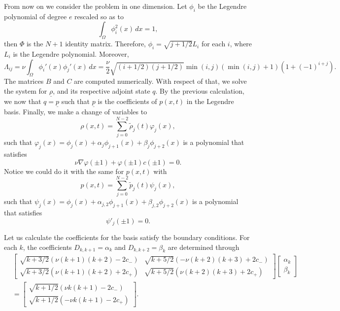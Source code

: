 \documentclass[12pt]{article}
\newcommand{\rhovec}{\underline{\rho}}
\theoremstyle{definition}
\begin{document}
From now on we consider the problem in one dimension. 
Let $\phi_i$ be the Legendre polynomial of degree $e$ rescaled so as to 
\[
\int_{\Omega} \phi^2_i(x) \, dx = 1,
\]
then $\Phi$ is the $N+1$ identity matrix.
Therefore, $\phi_i = \sqrt{j + 1/2} L_i$ for each $i$, where $L_i$ is the Legendre polynomial.
Moreover, 
\[    
\Lambda_{ij} = \nu \int_{\Omega} \phi_i'(x) \phi_j'(x) \, dx =  \frac{\nu}{2} \sqrt{(i+1/2)(j+1/2)}\min(i,j) (\min(i,j) + 1)\left(1 + {(-1)}^{i+j}\right).
\]
The matrices $B$ and $C$ are computed numerically.
With respect of that, we solve the system for $\rhovec$, and its respective adjoint state $q$. 
By the previous calculation, we now that $q = \underline{p}$ such that $\underline{p}$ is the coefficients of $p(x,t)$ in the Legendre basis.
Finally, we make a change of variables to 
\[
\rho(x,t) = \sum_{j=0}^{N-2} \tilde{\rho}_j(t) \varphi_j(x),     
\]
such that $\varphi_j(x) = \phi_j(x) + \alpha_j \phi_{j+1}(x) + \beta_j \phi_{j+2}(x)$ is a polynomial that satisfies 
\[
\nu \nabla \varphi(\pm 1) + \varphi(\pm 1) c(\pm 1) = 0.
\]
Notice we could do it with the same for $p(x,t)$ with
\[
p(x,t) = \sum_{j=0}^{N-2} \tilde{p}_j(t) \psi_j(x), 
\]
such that $\psi_j(x) = \phi_j(x) + \alpha_{j,2} \phi_{j+1}(x) + \beta_{j,2} \phi_{j+2}(x)$ is a polynomial that satisfies 
\[
\psi'_j(\pm 1) = 0.
\]

Let us calculate the coefficients for the basis satisfy the boundary conditions.
For each $k$, the coefficients $D_{k,k+1} = \alpha_k$ and $D_{k,k+2} = \beta_k$ are determined through
\[
\begin{split}
    &\begin{bmatrix}
        \sqrt{k + 3/2}(\nu (k+1)(k+2) - 2c_{-}) & \sqrt{k + 5/2}(-\nu (k+2)(k+3) + 2c_-) \\
        \sqrt{k + 3/2}(\nu (k+1)(k+2) + 2c_+) & \sqrt{k + 5/2}(\nu (k+2)(k+3) + 2c_+)
    \end{bmatrix}\begin{bmatrix}
        \alpha_k \\ \beta_k
    \end{bmatrix} \\
    &= \begin{bmatrix}
        \sqrt{k + 1/2}(\nu k(k+1) - 2c_-) \\ \sqrt{k + 1/2}(-\nu k(k+1) - 2c_+)
    \end{bmatrix}.
\end{split}
\]
\end{document}
